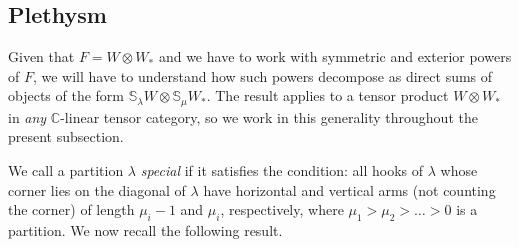 \documentclass[11pt]{article}
\theoremstyle{plain}
\theoremstyle{nonumberplain}
\theoremstyle{plain}
\numberwithin{equation}{section}
\theoremstyle{nonumberplain}
\newcommand\bC{{\mathbb C}}
\newcommand\1{{\bf 1}}
\begin{document}
\subsection{Plethysm}\label{subse:plet}


Given that $F=W\otimes W_*$ and we have to work with symmetric and exterior powers of $F$, we will have to understand how such powers decompose as direct sums of objects of the form $\mathbb{S}_{\lambda}W\otimes \mathbb{S}_{\mu}W_*$. The result applies to a tensor product $W\otimes W_*$ in {\it any} $\bC$-linear tensor category, so we work in this generality throughout the present subsection.

We call a partition $\lambda$ {\it special} if it satisfies the condition: all hooks of $\lambda$ whose corner lies on the diagonal of $\lambda$ have horizontal and vertical arms (not counting the corner) of length $\mu_i-1$ and $\mu_i$, respectively, where $\mu_1> \mu_2 > \ldots > 0$ is a partition. We now recall the following result.
\end{document}
